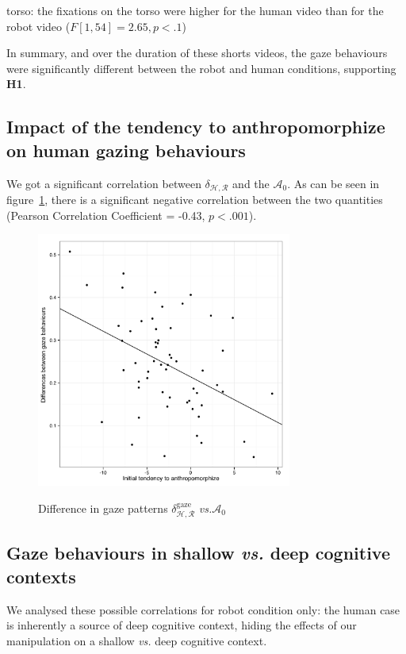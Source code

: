 \documentclass[lettersize, noapacite, twoside, HRI]{apa_HRI}
\newcommand{\vs}{\textit{vs.}\xspace}
\newcommand{\h}[1]{\textbf{H#1}\xspace}
\newcommand{\anti}{{$\mathcal{A}_0$\xspace}}
\begin{document}
{\sf torso}: the fixations on the torso were higher for the
human video than for the robot video ($F[1,54] = 2.65, p < .1$) 

In summary, and over the duration of these shorts videos, the gaze behaviours
were significantly different between the robot and human conditions, supporting
\h{1}.

\subsection{Impact of the tendency to anthropomorphize on human
gazing behaviours}

We got a significant correlation between $\delta_{\mathcal{H},\mathcal{R}}$ and
the \anti. As can be seen in figure~\ref{h2}, there is a significant negative
correlation between the two quantities (Pearson Correlation Coefficient = -0.43,
$p < .001$).

\begin{figure}
    \centering
    \includegraphics[width=3.3in]{H2}\label{GazeDifference-vs-ICA}
    \caption{Difference in gaze patterns $\delta_{\mathcal{H},
    \mathcal{R}}^{\text{gaze}}$ \vs \anti}
    \label{h2}
\end{figure}

\subsection{Gaze behaviours in shallow \vs deep cognitive contexts}

We analysed these possible correlations for robot condition only: the human case is
inherently a source of deep cognitive context, hiding the effects of our
manipulation on a shallow \vs deep cognitive context.
\end{document}
